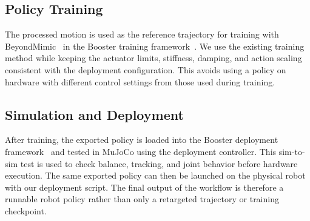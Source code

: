 \subsection{Policy Training}

The processed motion is used as the reference trajectory for training with BeyondMimic~\cite{beyondmimic} in the Booster training framework~\cite{boostertrain}. We use the existing training method while keeping the actuator limits, stiffness, damping, and action scaling consistent with the deployment configuration. This avoids using a policy on hardware with different control settings from those used during training.

\subsection{Simulation and Deployment}

After training, the exported policy is loaded into the Booster deployment framework~\cite{boosterdeploy} and tested in MuJoCo using the deployment controller. This sim-to-sim test is used to check balance, tracking, and joint behavior before hardware execution. The same exported policy can then be launched on the physical robot with our deployment script. The final output of the workflow is therefore a runnable robot policy rather than only a retargeted trajectory or training checkpoint.
